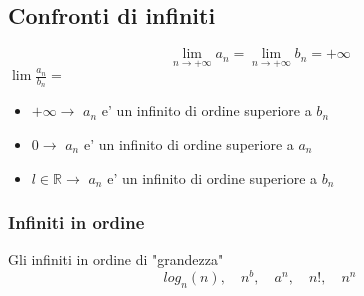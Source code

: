 \documentclass{article}
\begin{document}
        \subsection{Confronti di infiniti}
        \begin{flushleft}
            \begin{equation}
                \lim_{n\to+\infty} a_n=\lim_{n\to+\infty} b_n=+\infty
            \end{equation}
            $\lim \frac{a_n}{b_n} =$
            \begin{itemize}
            \item $+\infty \to$ $a_n$ e' un infinito di ordine superiore a $b_n$
            \item $0 \to$ $a_n$ e' un infinito di ordine superiore a $a_n$
            \item $l\in \mathbb{R} \to$ $a_n$ e' un infinito di ordine superiore a $b_n$
            \end{itemize}
        \end{flushleft}
        \subsubsection{Infiniti in ordine}
        \begin{flushleft}
           Gli infiniti in ordine di "grandezza"
           \begin{equation}
               log_n(n), \quad n^b, \quad a^n, \quad n!, \quad n^n
           \end{equation}
        \end{flushleft}
\end{document}
